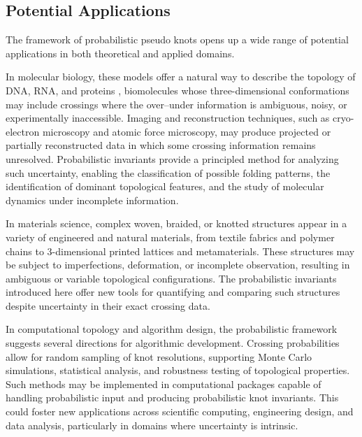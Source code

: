 \documentclass[a4paper, reqno, 12pt]{amsart}
\theoremstyle{plain}
\theoremstyle{definition}
\begin{document}
\subsection{Potential Applications}\label{sec:applications}

The framework of probabilistic pseudo knots opens up a wide range of potential applications in both theoretical and applied domains.

In molecular biology, these models offer a natural way to describe the topology of DNA, RNA, and proteins \cites{B,WassermanCozzarelli1986,VirnauMirnyKardar2006}, biomolecules whose three-dimensional conformations may include crossings where the over--under information is ambiguous, noisy, or experimentally inaccessible. Imaging and reconstruction techniques, such as cryo-electron microscopy and atomic force microscopy, may produce projected or partially reconstructed data in which some crossing information remains unresolved. Probabilistic invariants provide a principled method for analyzing such uncertainty, enabling the classification of possible folding patterns, the identification of dominant topological features, and the study of molecular dynamics under incomplete information.

In materials science, complex woven, braided, or knotted structures appear in a variety of engineered and natural materials, from textile fabrics and polymer chains \cite{SumnersWhittington1988} to \(3\)-dimensional printed lattices and metamaterials. These structures may be subject to imperfections, deformation, or incomplete observation, resulting in ambiguous or variable topological configurations. The probabilistic invariants introduced here offer new tools for quantifying and comparing such structures despite uncertainty in their exact crossing data.

In computational topology and algorithm design, the probabilistic framework suggests several directions for algorithmic development. Crossing probabilities allow for random sampling of knot resolutions, supporting Monte Carlo simulations, statistical analysis, and robustness testing of topological properties. Such methods may be implemented in computational packages capable of handling probabilistic input and producing probabilistic knot invariants. This could foster new applications across scientific computing, engineering design, and data analysis, particularly in domains where uncertainty is intrinsic.
\end{document}
